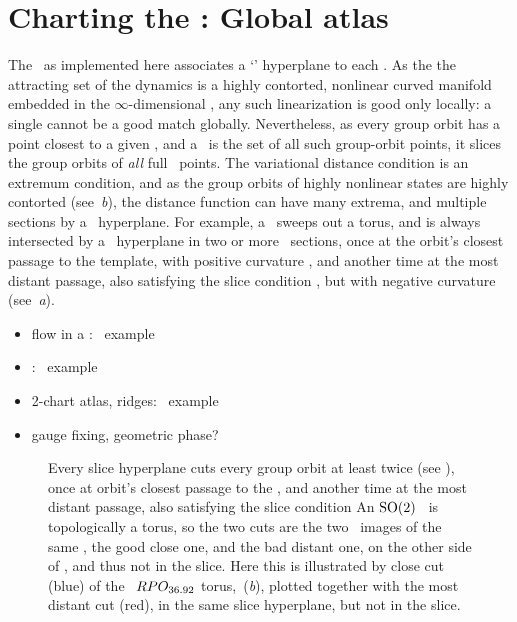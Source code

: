 
\section{Charting the \reducedsp: Global atlas}
\label{s:chart}

The \mslices\ as implemented here associates a `\slice' hyperplane to
each \template. As the the attracting set of the dynamics is a highly
contorted, nonlinear curved manifold embedded in the $\infty$-dimensional
\statesp, any such linearization is good only locally: a single
{\template} cannot be a good match  globally.
Nevertheless, as every group orbit has a point closest to
a given \template, and a \slice\ is the set of all such group-orbit
points, it slices the group orbits of \emph{all} full \statesp\ points.
The variational distance condition  is an extremum
condition, and as the group orbits of highly nonlinear states are highly
contorted (see \,{\it b}), the distance function can
have many extrema, and multiple sections by a \slice\ hyperplane. For
example, a \rpo\ sweeps out a torus, and is always intersected by a
\slice\ hyperplane in two or more \po\ sections, once at the orbit's
closest passage to the template, with positive curvature ,
and another time at the most distant passage, also satisfying the slice
condition , but with negative curvature (see
\,{\it a}).


    \begin{itemize}
      \item flow in a \slice: \cLf\ example
      \item {\chartBord}: \cLf\ example
      \item 2-chart atlas, ridges:  \cLf\ example
      \item gauge fixing, geometric phase?
    \end{itemize}


\begin{figure}
   \centering
   \caption{\label{fig:sliceimage}
      Every slice hyperplane cuts every group orbit at least twice (see
      ), once at       orbit's closest passage to the
      {\template}, and another
      time at the most distant passage, also satisfying the slice
      condition An
      $\textrm{SO}(2)$ \rpo\ is topologically a torus, so the two cuts are the
      two \po\ images of the same \rpo, the good close one, and the bad
      distant one, on the other side of {\sliceBord}, and thus not in the
      slice. Here this is illustrated by close cut (blue) of the \rpo\
      $RPO_{36.92}$ torus, \,({\it b}),
      plotted together with the most distant cut (red), in the same slice
      hyperplane, but not in the slice.
   }
\end{figure}

